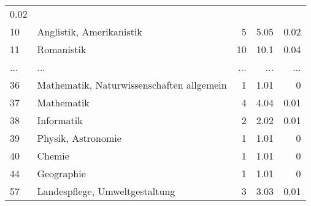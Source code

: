 \begin{longtable}{lXrrr}
          \num[round-mode=places,round-precision=2]{0.02} \\
        10 & \multicolumn{1}{X}{Anglistik, Amerikanistik} & %
          \num{5} &
          \num[round-mode=places,round-precision=2]{5.05} &
          \num[round-mode=places,round-precision=2]{0.02} \\
        11 & \multicolumn{1}{X}{Romanistik} & %
          \num{10} &
          \num[round-mode=places,round-precision=2]{10.1} &
          \num[round-mode=places,round-precision=2]{0.04} \\
       ... & ... & ... & ... & ... \\
        36 & \multicolumn{1}{X}{Mathematik, Naturwissenschaften allgemein} & %
          \num{1} &
          \num[round-mode=places,round-precision=2]{1.01} &
          \num[round-mode=places,round-precision=2]{0} \\

        37 & \multicolumn{1}{X}{Mathematik} & %
          \num{4} &
          \num[round-mode=places,round-precision=2]{4.04} &
          \num[round-mode=places,round-precision=2]{0.01} \\

        38 & \multicolumn{1}{X}{Informatik} & %
          \num{2} &
          \num[round-mode=places,round-precision=2]{2.02} &
          \num[round-mode=places,round-precision=2]{0.01} \\

        39 & \multicolumn{1}{X}{Physik, Astronomie} & %
          \num{1} &
          \num[round-mode=places,round-precision=2]{1.01} &
          \num[round-mode=places,round-precision=2]{0} \\

        40 & \multicolumn{1}{X}{Chemie} & %
          \num{1} &
          \num[round-mode=places,round-precision=2]{1.01} &
          \num[round-mode=places,round-precision=2]{0} \\

        44 & \multicolumn{1}{X}{Geographie} & %
          \num{1} &
          \num[round-mode=places,round-precision=2]{1.01} &
          \num[round-mode=places,round-precision=2]{0} \\

        57 & \multicolumn{1}{X}{Landespflege, Umweltgestaltung} & %
          \num{3} &
          \num[round-mode=places,round-precision=2]{3.03} &
          \num[round-mode=places,round-precision=2]{0.01} \\


\end{longtable}
